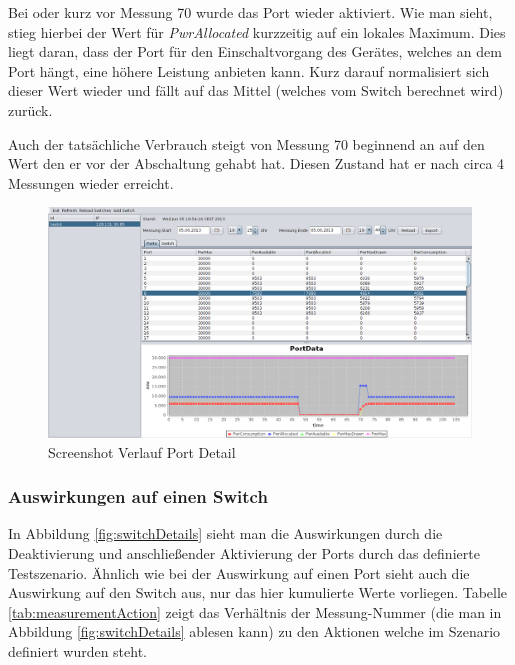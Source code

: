 Bei oder kurz vor Messung 70 wurde das Port wieder aktiviert. Wie man sieht, stieg hierbei der Wert für \textit{PwrAllocated} kurzzeitig auf ein lokales Maximum. Dies liegt daran, dass der Port für den Einschaltvorgang des Gerätes, welches an dem Port hängt, eine höhere Leistung anbieten kann. Kurz darauf normalisiert sich dieser Wert wieder und fällt auf das Mittel (welches vom Switch berechnet wird) zurück.

Auch der tatsächliche Verbrauch steigt von Messung 70 beginnend an auf den Wert den er vor der Abschaltung gehabt hat. Diesen Zustand hat er nach circa 4 Messungen wieder erreicht.

\begin{figure}[h]
    \centering
    \leavevmode
    \includegraphics[width=1.0\linewidth]{figures/portDetails}
    \caption{Screenshot Verlauf Port Detail}
    \label{fig:portDetails}
\end{figure}

\subsubsection{Auswirkungen auf einen Switch}
In Abbildung \ref{fig:switchDetails} sieht man die Auswirkungen durch die Deaktivierung und anschließender Aktivierung der Ports durch das definierte Testszenario. Ähnlich wie bei der Auswirkung auf einen Port sieht auch die Auswirkung auf den Switch aus, nur das hier kumulierte Werte vorliegen. Tabelle \ref{tab:measurementAction} zeigt das Verhältnis der Messung-Nummer (die man in Abbildung \ref{fig:switchDetails} ablesen kann) zu den Aktionen welche im Szenario definiert wurden steht.

